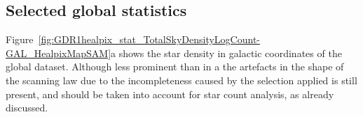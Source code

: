 %	

%



     
	



\subsection{Selected global statistics}

Figure~\ref{fig:GDR1healpix_stat_TotalSkyDensityLogCount-GAL_HealpixMapSAM}a shows the star density in galactic coordinates of the global {} dataset. Although less prominent than in a the artefacts in the shape of the scanning law due to the incompleteness caused by the selection applied is still present, and should be taken into account for star count analysis, as already discussed. 


